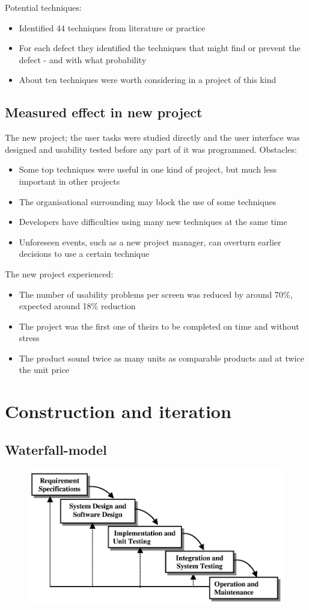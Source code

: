 \noindent Potential techniques:

\begin{itemize}
    \item Identified 44 techniques from literature or practice
    \item For each defect they identified the techniques that might find or prevent the defect - and with what probability
    \item About ten techniques were worth considering in a project of this kind
\end{itemize}
\subsection{Measured effect in new project}
The new project; the user tasks were studied directly and the user interface was designed and usability tested before any part of it was programmed. Obstacles:
\begin{itemize}
    \item Some top techniques were useful in one kind of project, but much less important in other projects
    \item The organisational surrounding may block the use of some techniques
    \item Developers have difficulties using many new techniques at the same time
    \item Unforeseen events, such as a new project manager, can overturn earlier decisions to use a certain technique
\end{itemize}

\noindent The new project experienced:
\begin{itemize}
    \item The number of usability problems per screen was reduced by around 70\%, expected around 18\% reduction
    \item The project was the first one of theirs to be completed on time and without stress
    \item The product sound twice as many units as comparable products and at twice the unit price
\end{itemize}

\section{Construction and iteration}
\subsection{Waterfall-model}
\begin{figure}[H]
    \centering
    \includegraphics[width=.6\textwidth]{figures/waterfallmodel.png}
\end{figure}

